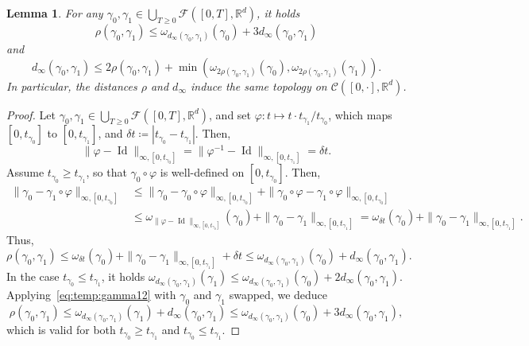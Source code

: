 \documentclass[11pt]{article}
\newtheorem{lemma}[theorem]{Lemma}
\begin{document}
\begin{lemma}
\label{le:sametopo}
  For any $\gamma_0,\gamma_1\in  \bigcup_{T\geq 0} \mathcal{F}( [0,T], \mathbb{R}^d)$, it holds
  \[ \rho (\gamma_0, \gamma_1)\leq \omega_{d_\infty(\gamma_0,\gamma_1) }(\gamma_0)+3 d_\infty(\gamma_0,\gamma_1) \]and \[
  d_\infty(\gamma_0,\gamma_1)\leq 2\rho (\gamma_0, \gamma_1) +\min(\omega_{2 \rho (\gamma_0, \gamma_1)}(\gamma_0),\omega_{2 \rho (\gamma_0, \gamma_1)}(\gamma_1)).\]
  In particular, the distances $\rho$ and $d_\infty$ induce the same topology on $ \mathcal{C}( [0,\cdot], \mathbb{R}^d)$.
\end{lemma}
\begin{proof}
   Let $\gamma_0,\gamma_1\in\bigcup_{T\geq 0} \mathcal{F}( [0,T], \mathbb{R}^d)$, and set $\varphi:t\mapsto t\cdot t_{\gamma_1}/t_{\gamma_0}$, which maps $[0,t_{\gamma_0}]$ to $[0,t_{\gamma_1}]$, and
   $\delta t\coloneqq |t_{\gamma_0}- t_{\gamma_1}|$.
  Then, \[ \|\varphi-\operatorname{Id}\|_{\infty,[0,t_{\gamma_0}] }=\|\varphi^{-1}-\operatorname{Id}\|_{\infty,[0,t_{\gamma_1}] }= \delta t.\]
  Assume $t_{\gamma_0}\geq t_{\gamma_1}$, so that $\gamma_0\circ \varphi$ is well-defined on $[0,t_{\gamma_0}]$. Then,
  \begin{align*} \|{\gamma}_0-{\gamma}_1\circ \varphi \|_{\infty,[0,t_{\gamma_0}] }
  &\leq
  \|{\gamma}_0-{\gamma}_0\circ \varphi \|_{\infty,[0,t_{\gamma_0}] }+
  \|{\gamma}_0\circ \varphi-{\gamma}_1\circ \varphi\|_{\infty,[0,t_{\gamma_0}] }\\
  &\leq \omega_{\|\varphi-\operatorname{Id}\|_{\infty,[0,t_{\gamma_0}] }  }(\gamma_0)+\|{\gamma}_0-{\gamma}_1\|_{\infty,[0,t_{\gamma_1}] }
  =\omega_{\delta t }(\gamma_0)+\|{\gamma}_0-{\gamma}_1\|_{\infty,[0,t_{\gamma_1}] }.
  \end{align*}
  Thus,
  \begin{equation}
  \label{eq:temp:gamma12}
  \rho (\gamma_0, \gamma_1)\leq \omega_{\delta t }(\gamma_0)+\|{\gamma}_0-{\gamma}_1\|_{\infty,[0,t_{\gamma_1}] }+\delta t \leq \omega_{d_\infty(\gamma_0,\gamma_1) }(\gamma_0)+d_\infty(\gamma_0,\gamma_1).
  \end{equation}
  In the case $t_{\gamma_0}\leq t_{\gamma_1}$, it holds $\omega_{d_\infty(\gamma_0,\gamma_1) }(\gamma_1)\leq \omega_{d_\infty(\gamma_0,\gamma_1) }(\gamma_0)+2 d_\infty(\gamma_0,\gamma_1) $. Applying~\eqref{eq:temp:gamma12} with $\gamma_0$ and $\gamma_1$ swapped, we deduce
  \[ \rho (\gamma_0, \gamma_1)\leq
  \omega_{d_\infty(\gamma_0,\gamma_1) }(\gamma_1)+d_\infty(\gamma_0,\gamma_1)\leq \omega_{d_\infty(\gamma_0,\gamma_1) }(\gamma_0)+3 d_\infty(\gamma_0,\gamma_1),
  \]
  which is valid for both $t_{\gamma_0}\geq t_{\gamma_1}$ and $t_{\gamma_0}\leq t_{\gamma_1}$.


\end{proof}
\end{document}
